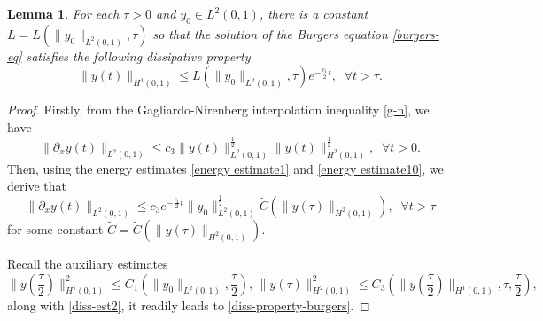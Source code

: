\documentclass[review]{elsarticle}
\newtheorem{lemma}[theorem]{Lemma}
\numberwithin{equation}{section}
\begin{document}
\begin{lemma}
\label{diss-property}
    For each $\tau>0$ and $y_0\in L^2(0,1)$, there is a constant $L=L\left(\|y_0\|_{L^2(0,1)},\tau\right)$ so that the solution of the Burgers equation \eqref{burgers-eq} satisfies the following dissipative property
     \begin{equation}
         \label{diss-property-burgers}
         \| y(t)\|_{H^1(0,1)}\le L\left(\|y_0\|_{L^2(0,1)},\tau\right)e^{-\frac{c_1 }{2}t},\;\;\forall t>\tau.
     \end{equation}
\end{lemma}
\begin{proof}
    Firstly, from the Gagliardo-Nirenberg interpolation inequality \eqref{g-n}, we have
    \begin{equation}
        \label{diss-est1}
        \|\partial_x y(t)\|_{L^2(0,1)}\le c_3\|y(t)\|_{L^2(0,1)}^{\frac{1}{2}}\|y(t)\|^{\frac{1}{2}}_{H^2(0,1)},\;\;\forall t>0.
    \end{equation}
    Then, using the energy estimates \eqref{energy estimate1} and \eqref{energy estimate10}, we derive that
    \begin{equation}
        \label{diss-est2}
          \|\partial_x y(t)\|_{L^2(0,1)}\le c_3e^{-\frac{c_1 }{2}t}\|y_0\|_{L^2(0,1)}^{\frac{1}{2}}\tilde{C}\left(\|y(\tau)\|_{H^2(0,1)}\right),\;\;\forall t>\tau
    \end{equation}
   for some constant $\tilde{C}=\tilde{C}\left(\|y(\tau)\|_{H^2(0,1)}\right)$.

   Recall the auxiliary estimates $$\| y(\frac{\tau}{2})\|_{H^1(0,1)}^2\le C_1\left(\|y_0\|_{L^2(0,1)},\frac{\tau}{2}\right),\,\|y(\tau)\|^2_{H^2(0,1)}\le C_3\left(\| y(\frac{\tau}{2})\|_{H^1(0,1)},\tau,\frac{\tau}{2}\right),$$along with \eqref{diss-est2}, it readily leads to \eqref{diss-property-burgers}.
\end{proof}
\end{document}
